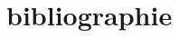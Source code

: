 \documentclass{wsdcr}
\begin{document}
\section{bibliographie}
\nocite{*}
\printbibliography
%
%
%
%
%
%
%
%
\end{document}
